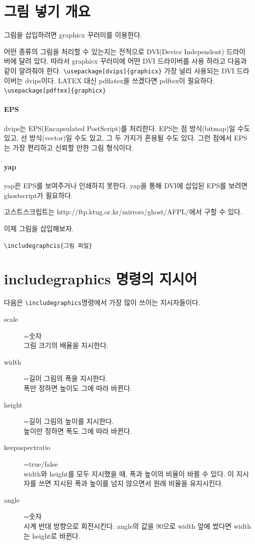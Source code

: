 	\clearpage
	\section{그림 넣기 개요}
	
			그림을 삽입하려면 graphicx 꾸러미를 이용한다. 
				
			
			어떤 종류의 그림을 처리할 수 있는지는 전적으로 DVI(Device Independent) 드라이버에 달려 있다. 
			따라서 graphicx 꾸러미에 어떤 DVI 드라이버를 사용 하라고 다음과 같이 알려줘야 한다.
			\verb|\usepackage[dvips]{graphicx}|
			가장 널리 사용되는 DVI 드라이버는 dvips이다. 
			LATEX 대신 pdflatex을 쓰겠다면 pdftex이 필요하다.
			\verb|\usepackage[pdftex]{graphicx}|
			
			\paragraph{EPS}
			dvips는 EPS(Encapsulated PostScript)를 처리한다. 
			EPS는 점 방식(bitmap)일 수도 있고, 선 방식(vector)일 수도 있고, 그 두 가지가 혼용될 수도 있다. 
			그런 점에서 EPS는 가장 편리하고 신뢰할 만한 그림 형식이다.
			
			\paragraph{yap}
			yap은 EPS를 보여주거나 인쇄하지 못한다. 
			yap을 통해 DVI에 삽입된 EPS를 보려면 ghostscript가 필요하다. 
			
			고스트스크립트는 http://ftp.ktug.or.kr/mirrors/ghost/AFPL/에서 구할 수 있다.
			
			이제 그림을 삽입해보자.
			
			\verb|\includegraphcis{그림 파일}|
			
	\clearpage
	\section{includegraphics 명령의 지시어}
			
			다음은 \verb|\includegraphics|명령에서 가장 많이 쓰이는 지시자들이다.
			\begin{description}
			\item[scale]=숫자 \\
					그림 크기의 배율을 지시한다.
			\item[width]=길이 그림의 폭을 지시한다. \\
					폭만 정하면 높이도 그에 따라 바뀐다.
			\item[height]=길이 그림의 높이를 지시한다. \\
					높이만 정하면 폭도 그에 따라 바뀐다.
			\item[keepaspectratio]=true/false \\
					width와 height를 모두 지시했을 때, 폭과 높이의 비율이 바뀔 수 있다.
					이 지시자를 쓰면 지시된 폭과 높이를 넘지 않으면서 원래 비율을 유지시킨다.
			\item[angle]=숫자 \\
					시계 반대 방향으로 회전시킨다. angle의 값을 90으로 width 앞에 썼다면 width는
			height로 바뀐다.
			\end{description}
	
